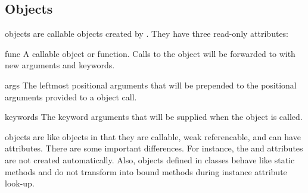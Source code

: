 \subsection{ Objects \label{partial-objects}}


 objects are callable objects created by .
They have three read-only attributes:

\begin{memberdesc}[callable]{func}{}
A callable object or function.  Calls to the  object will
be forwarded to  with new arguments and keywords.
\end{memberdesc}

\begin{memberdesc}[tuple]{args}{}
The leftmost positional arguments that will be prepended to the
positional arguments provided to a  object call.
\end{memberdesc}

\begin{memberdesc}[dict]{keywords}{}
The keyword arguments that will be supplied when the  object
is called.
\end{memberdesc}

 objects are like  objects in that they are
callable, weak referencable, and can have attributes.  There are some
important differences.  For instance, the  and
 attributes are not created automatically.  Also,
 objects defined in classes behave like static methods and
do not transform into bound methods during instance attribute look-up.
